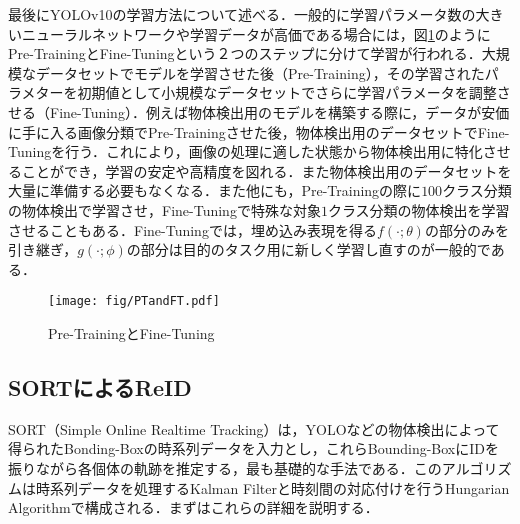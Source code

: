     最後にYOLOv10の学習方法について述べる．一般的に学習パラメータ数の大きいニューラルネットワークや学習データが高価である場合には，図\ref{fig:PTandFT}のようにPre-TrainingとFine-Tuningという２つのステップに分けて学習が行われる．大規模なデータセットでモデルを学習させた後（Pre-Training），その学習されたパラメターを初期値として小規模なデータセットでさらに学習パラメータを調整させる（Fine-Tuning）\cite{radford2018improving}．例えば物体検出用のモデルを構築する際に，データが安価に手に入る画像分類でPre-Trainingさせた後，物体検出用のデータセットでFine-Tuningを行う．これにより，画像の処理に適した状態から物体検出用に特化させることができ，学習の安定や高精度を図れる．また物体検出用のデータセットを大量に準備する必要もなくなる．また他にも，Pre-Trainingの際に$100$クラス分類の物体検出で学習させ，Fine-Tuningで特殊な対象$1$クラス分類の物体検出を学習させることもある．Fine-Tuningでは，埋め込み表現を得る$f(\cdot ; \theta)$の部分のみを引き継ぎ，$g(\cdot; \phi)$の部分は目的のタスク用に新しく学習し直すのが一般的である．

    \begin{figure}[t]
        \centering    
        \texttt{[image: fig/PTandFT.pdf]}
        \caption{Pre-TrainingとFine-Tuning}
        \label{fig:PTandFT}
    \end{figure}
    
    \subsection{SORTによるReID}
    SORT（Simple Online Realtime Tracking）は，YOLOなどの物体検出によって得られたBonding-Boxの時系列データを入力とし，これらBounding-BoxにIDを振りながら各個体の軌跡を推定する，最も基礎的な手法である．このアルゴリズムは時系列データを処理するKalman Filterと時刻間の対応付けを行うHungarian Algorithmで構成される．まずはこれらの詳細を説明する．

